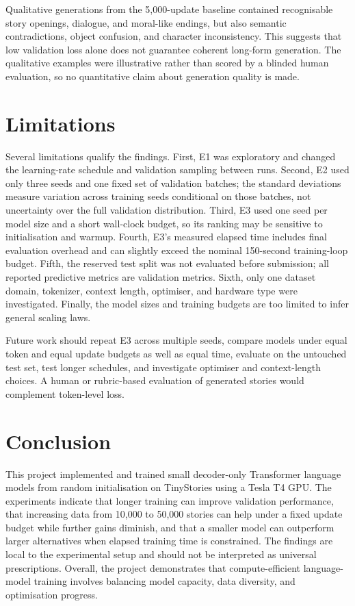 \documentclass[10pt,a4paper]{article}
\begin{document}
Qualitative generations from the 5,000-update baseline contained recognisable story openings, dialogue, and moral-like endings, but also semantic contradictions, object confusion, and character inconsistency. This suggests that low validation loss alone does not guarantee coherent long-form generation. The qualitative examples were illustrative rather than scored by a blinded human evaluation, so no quantitative claim about generation quality is made.

\section{Limitations}
Several limitations qualify the findings. First, E1 was exploratory and changed the learning-rate schedule and validation sampling between runs. Second, E2 used only three seeds and one fixed set of validation batches; the standard deviations measure variation across training seeds conditional on those batches, not uncertainty over the full validation distribution. Third, E3 used one seed per model size and a short wall-clock budget, so its ranking may be sensitive to initialisation and warmup. Fourth, E3's measured elapsed time includes final evaluation overhead and can slightly exceed the nominal 150-second training-loop budget. Fifth, the reserved test split was not evaluated before submission; all reported predictive metrics are validation metrics. Sixth, only one dataset domain, tokenizer, context length, optimiser, and hardware type were investigated. Finally, the model sizes and training budgets are too limited to infer general scaling laws.

Future work should repeat E3 across multiple seeds, compare models under equal token and equal update budgets as well as equal time, evaluate on the untouched test set, test longer schedules, and investigate optimiser and context-length choices. A human or rubric-based evaluation of generated stories would complement token-level loss.

\section{Conclusion}
This project implemented and trained small decoder-only Transformer language models from random initialisation on TinyStories using a Tesla T4 GPU. The experiments indicate that longer training can improve validation performance, that increasing data from 10,000 to 50,000 stories can help under a fixed update budget while further gains diminish, and that a smaller model can outperform larger alternatives when elapsed training time is constrained. The findings are local to the experimental setup and should not be interpreted as universal prescriptions. Overall, the project demonstrates that compute-efficient language-model training involves balancing model capacity, data diversity, and optimisation progress.

\nocite{*}


\end{document}
